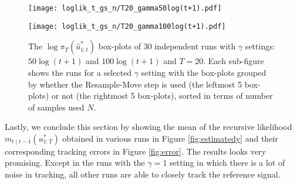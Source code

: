 \begin{figure}[!thbp]
    \centering
    \begin{minipage}{.5\textwidth}
        \centering
        \texttt{[image: loglik\_t\_gs\_n/T20\_gamma50log(t+1).pdf]}
    \end{minipage}%
    \begin{minipage}{0.5\textwidth}
        \centering
        \texttt{[image: loglik\_t\_gs\_n/T20\_gamma100log(t+1).pdf]}
    \end{minipage}
    \caption{The $\log\pi_T(\hat{u}^*_{1:t})$ box-plots of 30 independent runs with $\gamma$ settings: $50\log(t+1)$ and $100\log(t+1)$ and $T = 20$. Each sub-figure shows the runs for a selected $\gamma$ setting with the box-plots grouped by whether the Resample-Move step is used (the leftmost 5 box-plots) or not (the rightmost 5 box-plots), sorted in terms of number of samples used $N$.}
    \label{fig:log}
\end{figure}

Lastly, we conclude this section by showing the mean of the recursive likelihood $m_{t \mid t-1}(u^*_{1:T})$ obtained in various runs in Figure \ref{fig:estimatedy} and their corresponding tracking errors in Figure \ref{fig:error}. The results looks very promising. Except in the runs with the $\gamma=1$ setting in which there is a lot of noise in tracking, all other runs are able to closely track the reference signal. 

